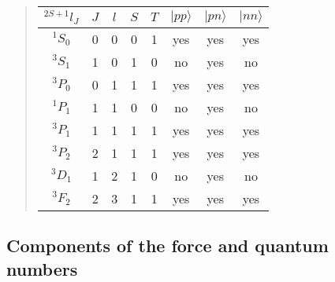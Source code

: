 \documentclass[%
twoside,                 %
final,                   %
10pt]{article}
\begin{document}
\begin{quote}
\begin{tabular}{cccccccc}
\hline
\multicolumn{1}{c}{ $^{2S+1}l_J$ } & \multicolumn{1}{c}{ $J$ } & \multicolumn{1}{c}{ $l$ } & \multicolumn{1}{c}{ $S$ } & \multicolumn{1}{c}{ $T$ } & \multicolumn{1}{c}{ $\vert pp\rangle$ } & \multicolumn{1}{c}{ $\vert pn\rangle$ } & \multicolumn{1}{c}{ $\vert nn\rangle$ } \\
\hline
$^{1}S_0$    & 0   & 0   & 0   & 1   & yes               & yes               & yes               \\
$^{3}S_1$    & 1   & 0   & 1   & 0   & no                & yes               & no                \\
$^{3}P_0$    & 0   & 1   & 1   & 1   & yes               & yes               & yes               \\
$^{1}P_1$    & 1   & 1   & 0   & 0   & no                & yes               & no                \\
$^{3}P_1$    & 1   & 1   & 1   & 1   & yes               & yes               & yes               \\
$^{3}P_2$    & 2   & 1   & 1   & 1   & yes               & yes               & yes               \\
$^{3}D_1$    & 1   & 2   & 1   & 0   & no                & yes               & no                \\
$^{3}F_2$    & 2   & 3   & 1   & 1   & yes               & yes               & yes               \\
\hline
\end{tabular}
\end{quote}

\noindent





\subsection*{Components of the force and quantum numbers}

\end{document}
